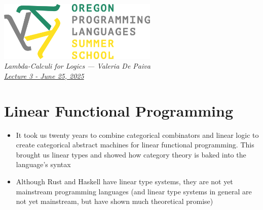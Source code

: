 \documentclass[11pt]{article}
\begin{document}
\thispagestyle{plain}
\begin{center}
\includegraphics[width=3in]{oplssLogo.png}\\[2\parskip]
\sffamily \LARGE \slshape Lambda-Calculi for Logics
--- \upshape Valeria De Paiva \\[2ex]
\href{https://github.com/vcvpaiva/DialecticaCategories/blob/master/OPLSS2025/OregonLecture3.pdf}{\large Lecture 3 - \slshape June 25, 2025}
\end{center}

\section{Linear Functional Programming}
\begin{itemize}
    \item It took us twenty years to combine categorical combinators and linear logic to create categorical abstract machines for linear functional programming. This brought us linear types and showed how category theory is baked into the language's syntax
    \item Although Rust and Haskell have linear type systems, they are not yet mainstream programming languages\cite{Bernardy2017LinearHaskell} (and linear type systems in general are not yet mainstream, but have shown much theoretical promise)
\end{itemize}
\end{document}
